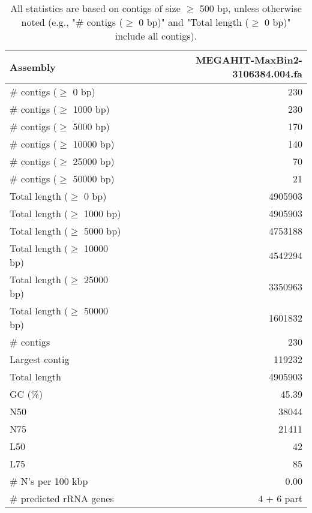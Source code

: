 \documentclass[12pt,a4paper]{article}
\begin{document}
\begin{table}[ht]
\begin{center}
\caption{All statistics are based on contigs of size $\geq$ 500 bp, unless otherwise noted (e.g., "\# contigs ($\geq$ 0 bp)" and "Total length ($\geq$ 0 bp)" include all contigs).}
\begin{tabular}{|l*{1}{|r}|}
\hline
Assembly & MEGAHIT-MaxBin2-3106384.004.fa \\ \hline
\# contigs ($\geq$ 0 bp) & 230 \\ \hline
\# contigs ($\geq$ 1000 bp) & 230 \\ \hline
\# contigs ($\geq$ 5000 bp) & 170 \\ \hline
\# contigs ($\geq$ 10000 bp) & 140 \\ \hline
\# contigs ($\geq$ 25000 bp) & 70 \\ \hline
\# contigs ($\geq$ 50000 bp) & 21 \\ \hline
Total length ($\geq$ 0 bp) & 4905903 \\ \hline
Total length ($\geq$ 1000 bp) & 4905903 \\ \hline
Total length ($\geq$ 5000 bp) & 4753188 \\ \hline
Total length ($\geq$ 10000 bp) & 4542294 \\ \hline
Total length ($\geq$ 25000 bp) & 3350963 \\ \hline
Total length ($\geq$ 50000 bp) & 1601832 \\ \hline
\# contigs & 230 \\ \hline
Largest contig & 119232 \\ \hline
Total length & 4905903 \\ \hline
GC (\%) & 45.39 \\ \hline
N50 & 38044 \\ \hline
N75 & 21411 \\ \hline
L50 & 42 \\ \hline
L75 & 85 \\ \hline
\# N's per 100 kbp & 0.00 \\ \hline
\# predicted rRNA genes & 4 + 6 part \\ \hline
\end{tabular}
\end{center}
\end{table}
\end{document}
